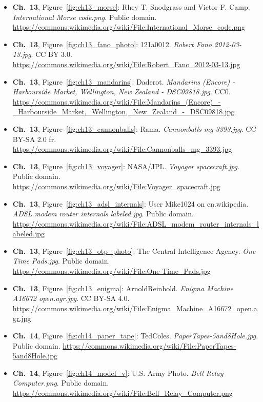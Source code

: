 \begin{small}
\begin{itemize}[leftmargin=0pt,itemsep=2pt,label={}]
\item \textbf{Ch.~13}, Figure~\ref{fig:ch13_morse}: Rhey T. Snodgrass and Victor F. Camp. \emph{International Morse code.\allowbreak{}png}. Public domain. \url{https://commons.wikimedia.org/wiki/File:International_Morse_code.png}
\item \textbf{Ch.~13}, Figure~\ref{fig:ch13_fano_photo}: 121a0012. \emph{Robert Fano 2012-\allowbreak{}03-\allowbreak{}13.\allowbreak{}jpg}. CC BY 3.0. \url{https://commons.wikimedia.org/wiki/File:Robert_Fano_2012-03-13.jpg}
\item \textbf{Ch.~13}, Figure~\ref{fig:ch13_mandarins}: Daderot. \emph{Mandarins (Encore) -\allowbreak{} Harbourside Market, Wellington, New Zealand -\allowbreak{} DSC09818.\allowbreak{}jpg}. CC0. \url{https://commons.wikimedia.org/wiki/File:Mandarins_(Encore)_-_Harbourside_Market,_Wellington,_New_Zealand_-_DSC09818.jpg}
\item \textbf{Ch.~13}, Figure~\ref{fig:ch13_cannonballs}: Rama. \emph{Cannonballs mg 3393.\allowbreak{}jpg}. CC BY-SA 2.0 fr. \url{https://commons.wikimedia.org/wiki/File:Cannonballs_mg_3393.jpg}
\item \textbf{Ch.~13}, Figure~\ref{fig:ch13_voyager}: NASA/JPL. \emph{Voyager spacecraft.\allowbreak{}jpg}. Public domain. \url{https://commons.wikimedia.org/wiki/File:Voyager_spacecraft.jpg}
\item \textbf{Ch.~13}, Figure~\ref{fig:ch13_adsl_internals}: User Mike1024 on en.wikipedia. \emph{ADSL modem router internals labeled.\allowbreak{}jpg}. Public domain. \url{https://commons.wikimedia.org/wiki/File:ADSL_modem_router_internals_labeled.jpg}
\item \textbf{Ch.~13}, Figure~\ref{fig:ch13_otp_photo}: The Central Intelligence Agency. \emph{One-\allowbreak{}Time Pads.\allowbreak{}jpg}. Public domain. \url{https://commons.wikimedia.org/wiki/File:One-Time_Pads.jpg}
\item \textbf{Ch.~13}, Figure~\ref{fig:ch13_enigma}: ArnoldReinhold. \emph{Enigma Machine A16672 open.\allowbreak{}agr.\allowbreak{}jpg}. CC BY-SA 4.0. \url{https://commons.wikimedia.org/wiki/File:Enigma_Machine_A16672_open.agr.jpg}
\item \textbf{Ch.~14}, Figure~\ref{fig:ch14_paper_tape}: TedColes. \emph{PaperTapes-\allowbreak{}5and8Hole.\allowbreak{}jpg}. Public domain. \url{https://commons.wikimedia.org/wiki/File:PaperTapes-5and8Hole.jpg}
\item \textbf{Ch.~14}, Figure~\ref{fig:ch14_model_v}: U.S. Army Photo. \emph{Bell Relay Computer.\allowbreak{}png}. Public domain. \url{https://commons.wikimedia.org/wiki/File:Bell_Relay_Computer.png}

\end{itemize}
\end{small}
